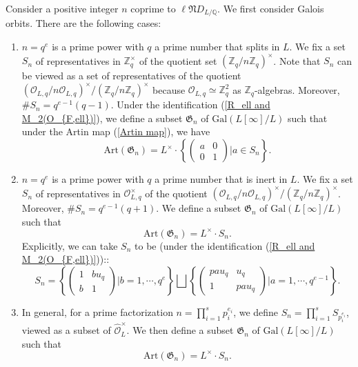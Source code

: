 \documentclass[11pt,oneside,reqno]{amsart}
\newcommand{\Art}{\mathrm{Art}}
\newcommand{\Gal}{\mathrm{Gal}}
\newcommand{\Q}{\mathbb{Q}}
\newcommand{\Z}{\mathbb{Z}}
\newcommand{\Ocal}{\mathcal{O}}
\newcommand{\Gfrak}{\mathfrak{G}}
\newcommand{\Nfrak}{\mathfrak{N}}
\theoremstyle{plain}
\begin{document}
	
	Consider a positive integer $n$ coprime to $\ell\Nfrak D_{L/\Q}$. We first consider Galois orbits. There are the following cases:
	\begin{enumerate}		
		\item 
		$n=q^e$ is a prime power with $q$ a prime number that splits in $L$. We fix a set $S_n$ of representatives in $\Z_q^\times$ of the quotient set $(\Z_q/n\Z_q)^\times$. Note that $S_n$ can be viewed as a set of representatives of the quotient $(\Ocal_{L,q}/n\Ocal_{L,q})^\times/(\Z_q/n\Z_q)^\times$ because $\Ocal_{L,q}\simeq\Z_q^2$ as $\Z_q$-algebras. Moreover, $\#S_n=q^{e-1}(q-1)$. Under the identification (\ref{R_ell and M_2(O_{F,ell})}), we define a subset $\Gfrak_n$ of $\Gal(L[\infty]/L)$ such that under the Artin map (\ref{Artin map}), we have
		\[
		\Art(\Gfrak_n)
		=
		L^\times\cdot
		\left\{
		\begin{pmatrix}
			a & 0 \\ 0 & 1
		\end{pmatrix}|a\in S_n
		\right\}.
		\]
		
		
		
		
		\item 
		$n=q^e$ is a prime power with $q$ a prime number that is inert in $L$. We fix a set $S_n$ of representatives in $\Ocal_{L,q}^\times$ of the quotient $(\Ocal_{L,q}/n\Ocal_{L,q})^\times/(\Z_q/n\Z_q)^\times$. Moreover, $\#S_n=q^{e-1}(q+1)$. We define a subset $\Gfrak_n$ of $\Gal(L[\infty]/L)$ such that
		\[
		\Art(\Gfrak_n)
		=
		L^\times\cdot S_n.
		\]
		Explicitly, we can take $S_n$ to be (under the identification (\ref{R_ell and M_2(O_{F,ell})}))::
		\[
		S_n
		=
		\left\{
		\begin{pmatrix}
			1 & bu_q \\ b & 1
		\end{pmatrix}|b=1,\cdots,q^e
		\right\}
		\bigsqcup
		\left\{
		\begin{pmatrix}
			pau_q & u_q \\ 1 & pau_q
		\end{pmatrix}|a=1,\cdots,q^{e-1}
		\right\}.
		\]
		
		
		\item 
		In general, for a prime factorization $n=\prod_{i=1}^sp_i^{e_i}$, we define $S_n=\prod_{i=1}^sS_{p_i^{e_i}}$, viewed as a subset of $\widehat{\Ocal}_L^\times$. We then define a subset $\Gfrak_n$ of $\Gal(L[\infty]/L)$ such that
		\[
		\Art(\Gfrak_n)
		=
		L^\times\cdot S_n.
		\]
	\end{enumerate}
	
	
	
\end{document}
